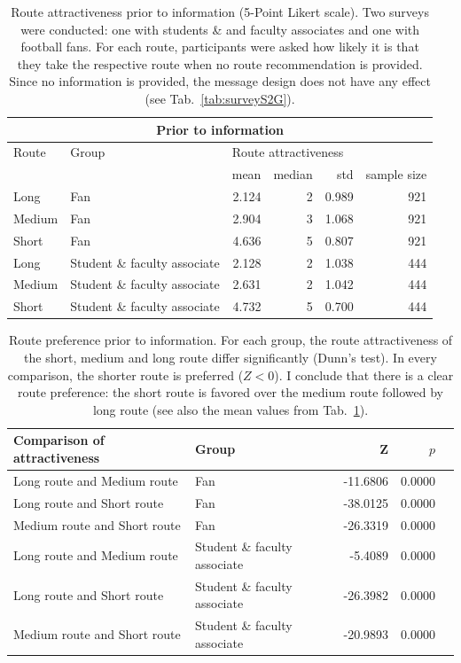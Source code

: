 \begin{table}[H]
\begin{tabular}{llrrrr}
\multicolumn{6}{c}{\textbf{Prior to information}}\\                                                                                                                                         
  \hline
Route & Group &\multicolumn{3}{l}{Route attractiveness}                                                                                                                                            &  \\ 
 &  &mean & median & std & sample size \\
  \hline
 Long & Fan & 2.124 & 2 & 0.989 & 921 \\ 
  Medium & Fan & 2.904 & 3 & 1.068 & 921 \\ 
  Short & Fan & 4.636 & 5 & 0.807 & 921 \\ 
 Long & Student \& faculty associate & 2.128 & 2 & 1.038 & 444 \\ 
  Medium & Student \& faculty associate  & 2.631 & 2 & 1.042 & 444 \\ 
Short & Student \& faculty associate  & 4.732 & 5 & 0.700 & 444 \\ 
   \hline
\end{tabular}
\caption[]{Route attractiveness prior to information (5-Point Likert scale). Two surveys were conducted: one with students \& and faculty associates and one with football fans.
For each route, participants were asked how likely it is that they take the respective route when no route recommendation is provided. Since no information is provided, the message design does not have any effect (see Tab.~\ref{tab:surveyS2G}).}
\label{tab:surveyS2E}
\end{table}


\begin{table}[H]
\begin{tabular}{llrrr}
  \hline
Comparison of attractiveness & Group & Z & $p$  \\ 
  \hline
Long route and Medium route & Fan &  -11.6806 & 0.0000  \\ 
Long route and Short route & Fan &  -38.0125 & 0.0000  \\ 
 Medium route and Short route &Fan &  -26.3319 & 0.0000  \\ 
  Long route and Medium route & Student \& faculty associate &  -5.4089 & 0.0000  \\ 
 Long route and Short route & Student \& faculty associate &  -26.3982 & 0.0000  \\ 
 Medium route and Short route & Student \& faculty associate &  -20.9893 & 0.0000 \\ 
   \hline
\end{tabular}
\caption{ Route preference prior to information. For each group, the route attractiveness of the short, medium and long route differ significantly (Dunn's test). In every comparison, the shorter route is preferred ($Z < 0$).
I conclude that there is a clear route preference: the short route is favored over the medium route followed by long route (see also the mean values from Tab.~\ref{tab:surveyS2E}).}
\label{tab:surveyS2F}
\end{table}


